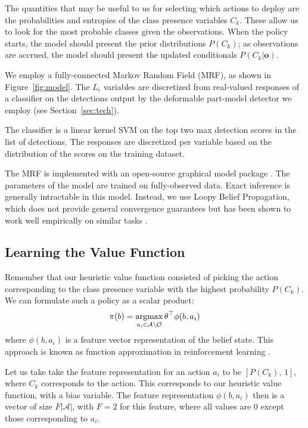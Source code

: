 The quantities that may be useful to us for selecting which actions to deploy are the probabilities and entropies of the class presence variables $C_k$.
These allow us to look for the most probable classes given the observations.
When the policy starts, the model should present the prior distributions $P(C_k)$; as observations are accrued, the model should present the updated conditionals $P(C_k|\mathbf{o})$.

We employ a fully-connected Markov Random Field (MRF), as shown in Figure~\ref{fig:model}.
The $L_i$ variables are discretized from real-valued responses of a classifier on the detections output by the deformable part-model detector we employ (see Section~\ref{sec:tech}).

The classifier is a linear kernel SVM on the top two max detection scores in the list of detections.
The responses are discretized per variable based on the distribution of the scores on the training dataset.

The MRF is implemented with an open-source graphical model package \cite{Jaimovich2010}.
The parameters of the model are trained on fully-observed data.
Exact inference is generally intractable in this model.
Instead, we use Loopy Belief Propagation, which does not provide general convergence guarantees but has been shown to work well empirically on similar tasks \cite{Desai2009}.

\subsection{Learning the Value Function}

Remember that our heuristic value function consisted of picking the action corresponding to the class presence variable with the highest probability $P(C_k)$.
We can formulate such a policy as a scalar product:
\begin{align}
\pi(b) = \argmax_{a_i \in \mathcal{A} \setminus \mathcal{O}} \theta^\top \phi(b,a_i)
\end{align}
where $\phi(b,a_i)$ is a feature vector representation of the belief state.
This approach is known as function approximation in reinforcement learning \cite{Sutton1998}.

Let us take take the feature representation for an action $a_i$ to be $[P(C_k), \, 1]$, where $C_k$ corresponds to the action.
This corresponds to our heuristic value function, with a bias variable.
The feature representation $\phi(b,a_i)$ then is a vector of size $F|\mathcal{A}|$, with $F=2$ for this feature, where all values are $0$ except those corresponding to $a_i$.

